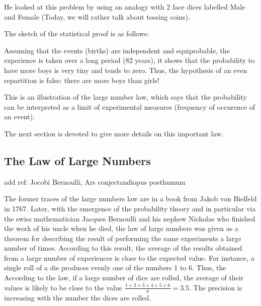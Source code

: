 He looked at this problem by using an analogy with 2 face dices labelled Male and Female
(Today, we will rather talk about tossing coins). 
\medskip

The sketch of the statistical proof is as follows:

Assuming that the events (births) are independent and equiprobable,
the experience is taken over a long period (82 years), it shows that the probability to have more boys is very tiny and
tends to zero. 
Thus, the hypothesis of an even repartition is false: there are more boys than girls!
\medskip

This is an illustration of the large number law, which says that the probability can be interpreted 
as a limit of experimental measures (frequency of occurence of an event). 
\bigskip

\noindent {}
\bigskip

The next section is devoted to give more details on this important law.


\subsection{The Law of Large Numbers} 
\label{subsec:LawLargeNumbers}

{\Denis add ref: Jocobi Bernoulli, Ars conjectandiopus posthumum}

The former traces of the large numbers law are in a book from Jakob von Bielfeld in 1767.
Later, with the emergence of the probability theory and in particular via the swiss mathematician Jacques Bernoulli
and his nephew Nicholas who finished the work of his uncle when he died, 
the law of large numbers was given as a theorem for describing the result of performing the same experiments
 a large number of times. 
 According to this result, the average of the results obtained from a large number of experiences is close 
 to the expected value. 
For instance, a single roll of a die produces evenly one of the numbers 1 to 6.
Thus, the According to the law, if a large number of dice are rolled, the average of their values 
is likely to be close to the value $\frac{1+2+3+4+5+6}{6}=3.5$.
The precision is increasing with the number the dices are rolled. 

